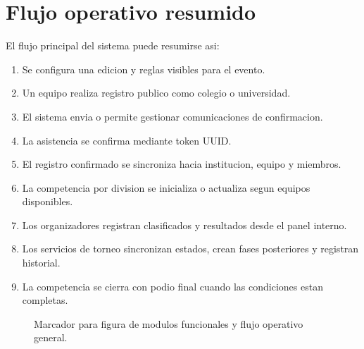 \section{Flujo operativo resumido}
\label{sec:descripcion-flujo-operativo}

El flujo principal del sistema puede resumirse asi:

\begin{enumerate}
  \item Se configura una edicion y reglas visibles para el evento.
  \item Un equipo realiza registro publico como colegio o universidad.
  \item El sistema envia o permite gestionar comunicaciones de confirmacion.
  \item La asistencia se confirma mediante token UUID.
  \item El registro confirmado se sincroniza hacia institucion, equipo y miembros.
  \item La competencia por division se inicializa o actualiza segun equipos disponibles.
  \item Los organizadores registran clasificados y resultados desde el panel interno.
  \item Los servicios de torneo sincronizan estados, crean fases posteriores y registran historial.
  \item La competencia se cierra con podio final cuando las condiciones estan completas.
\end{enumerate}

\begin{figure}[H]
  \centering
  \caption{Marcador para figura de modulos funcionales y flujo operativo general.}
  \label{fig:descripcion-flujo-operativo}
\end{figure}
